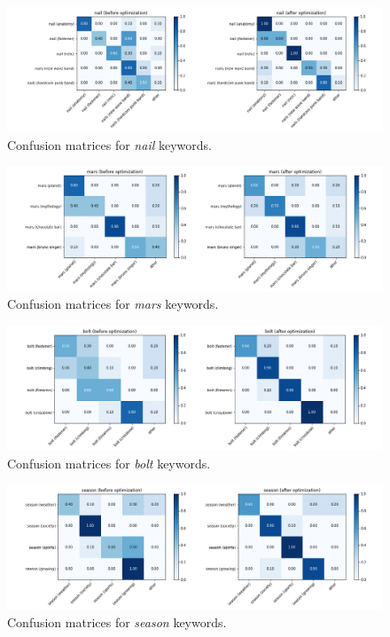 \documentclass{llncs}
\begin{document}
\begin{figure}
    \centering
    \caption{Confusion matrices for \textit{nail} keywords.}
    \label{fig:cm_nail}
    \includegraphics[scale=0.38]{res/cm_nail.png}
\end{figure}

\begin{figure}
    \centering
    \caption{Confusion matrices for \textit{mars} keywords.}
    \label{fig:cm_mars}
    \includegraphics[scale=0.38]{res/cm_mars.png}
\end{figure}

\begin{figure}
    \centering
    \caption{Confusion matrices for \textit{bolt} keywords.}
    \label{fig:cm_bolt}
    \includegraphics[scale=0.38]{res/cm_bolt.png}
\end{figure}

\begin{figure}
    \centering
    \caption{Confusion matrices for \textit{season} keywords.}
    \label{fig:cm_season}
    \includegraphics[scale=0.38]{res/cm_season.png}
\end{figure}
\end{document}
